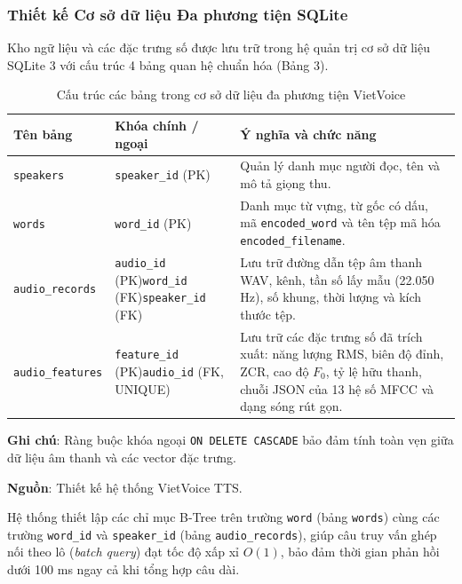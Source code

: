 \subsubsection{Thiết kế Cơ sở dữ liệu Đa phương tiện SQLite}
Kho ngữ liệu và các đặc trưng số được lưu trữ trong hệ quản trị cơ sở dữ liệu SQLite 3 với cấu trúc 4 bảng quan hệ chuẩn hóa (Bảng 3).

\begin{table}[H]
\centering
\caption{Cấu trúc các bảng trong cơ sở dữ liệu đa phương tiện VietVoice}
\label{tab:db_schema}
\vspace{2pt}
\begin{tabularx}{\textwidth}{p{3.0cm}p{3.8cm}X}
\toprule
\textbf{Tên bảng} & \textbf{Khóa chính / ngoại} & \textbf{Ý nghĩa và chức năng} \\
\midrule
\texttt{speakers} & \texttt{speaker\_id} (PK) & Quản lý danh mục người đọc, tên và mô tả giọng thu. \\
\addlinespace
\texttt{words} & \texttt{word\_id} (PK) & Danh mục từ vựng, từ gốc có dấu, mã \texttt{encoded\_word} và tên tệp mã hóa \texttt{encoded\_filename}. \\
\addlinespace
\texttt{audio\_records} & \texttt{audio\_id} (PK)\newline \texttt{word\_id} (FK)\newline \texttt{speaker\_id} (FK) & Lưu trữ đường dẫn tệp âm thanh WAV, kênh, tần số lấy mẫu (22.050 Hz), số khung, thời lượng và kích thước tệp. \\
\addlinespace
\texttt{audio\_features} & \texttt{feature\_id} (PK)\newline \texttt{audio\_id} (FK, UNIQUE) & Lưu trữ các đặc trưng số đã trích xuất: năng lượng RMS, biên độ đỉnh, ZCR, cao độ $F_0$, tỷ lệ hữu thanh, chuỗi JSON của 13 hệ số MFCC và dạng sóng rút gọn. \\
\bottomrule
\end{tabularx}
\par\vspace{4pt}
\begin{minipage}{\textwidth}
\fontsize{12}{14}\selectfont \textbf{Ghi chú}: Ràng buộc khóa ngoại \texttt{ON DELETE CASCADE} bảo đảm tính toàn vẹn giữa dữ liệu âm thanh và các vector đặc trưng.\par
\textbf{Nguồn}: Thiết kế hệ thống VietVoice TTS.
\end{minipage}
\end{table}

Hệ thống thiết lập các chỉ mục B-Tree trên trường \texttt{word} (bảng \texttt{words}) cùng các trường \texttt{word\_id} và \texttt{speaker\_id} (bảng \texttt{audio\_records}), giúp câu truy vấn ghép nối theo lô (\textit{batch query}) đạt tốc độ xấp xỉ $O(1)$, bảo đảm thời gian phản hồi dưới 100 ms ngay cả khi tổng hợp câu dài.

